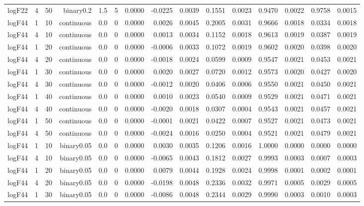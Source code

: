 \begin{longtable}{rrrrrrrrrrrrrrr}
  logF22 & 4 & 50 & binary0.2 & 1.5 & 5 & 0.0000 & -0.0225 & 0.0039 & 0.1551 & 0.0023 & 0.9470 & 0.0022 & 0.9758 & 0.0015 \\ 
  logF44 & 1 & 10 & continuous & 0.0 & 0 & 0.0000 & 0.0026 & 0.0045 & 0.2005 & 0.0031 & 0.9666 & 0.0018 & 0.0334 & 0.0018 \\ 
  logF44 & 4 & 10 & continuous & 0.0 & 0 & 0.0000 & 0.0013 & 0.0034 & 0.1152 & 0.0018 & 0.9613 & 0.0019 & 0.0387 & 0.0019 \\ 
  logF44 & 1 & 20 & continuous & 0.0 & 0 & 0.0000 & -0.0006 & 0.0033 & 0.1072 & 0.0019 & 0.9602 & 0.0020 & 0.0398 & 0.0020 \\ 
  logF44 & 4 & 20 & continuous & 0.0 & 0 & 0.0000 & -0.0018 & 0.0024 & 0.0599 & 0.0009 & 0.9547 & 0.0021 & 0.0453 & 0.0021 \\ 
  logF44 & 1 & 30 & continuous & 0.0 & 0 & 0.0000 & 0.0020 & 0.0027 & 0.0720 & 0.0012 & 0.9573 & 0.0020 & 0.0427 & 0.0020 \\ 
  logF44 & 4 & 30 & continuous & 0.0 & 0 & 0.0000 & -0.0012 & 0.0020 & 0.0406 & 0.0006 & 0.9550 & 0.0021 & 0.0450 & 0.0021 \\ 
  logF44 & 1 & 40 & continuous & 0.0 & 0 & 0.0000 & 0.0010 & 0.0023 & 0.0540 & 0.0009 & 0.9529 & 0.0021 & 0.0471 & 0.0021 \\ 
  logF44 & 4 & 40 & continuous & 0.0 & 0 & 0.0000 & -0.0020 & 0.0018 & 0.0307 & 0.0004 & 0.9543 & 0.0021 & 0.0457 & 0.0021 \\ 
  logF44 & 1 & 50 & continuous & 0.0 & 0 & 0.0000 & -0.0001 & 0.0021 & 0.0422 & 0.0007 & 0.9527 & 0.0021 & 0.0473 & 0.0021 \\ 
  logF44 & 4 & 50 & continuous & 0.0 & 0 & 0.0000 & -0.0024 & 0.0016 & 0.0250 & 0.0004 & 0.9521 & 0.0021 & 0.0479 & 0.0021 \\ 
  logF44 & 1 & 10 & binary0.05 & 0.0 & 0 & 0.0000 & 0.0030 & 0.0035 & 0.1206 & 0.0016 & 1.0000 & 0.0000 & 0.0000 & 0.0000 \\ 
  logF44 & 4 & 10 & binary0.05 & 0.0 & 0 & 0.0000 & -0.0065 & 0.0043 & 0.1812 & 0.0027 & 0.9993 & 0.0003 & 0.0007 & 0.0003 \\ 
  logF44 & 1 & 20 & binary0.05 & 0.0 & 0 & 0.0000 & 0.0079 & 0.0044 & 0.1928 & 0.0024 & 0.9998 & 0.0001 & 0.0002 & 0.0001 \\ 
  logF44 & 4 & 20 & binary0.05 & 0.0 & 0 & 0.0000 & -0.0198 & 0.0048 & 0.2336 & 0.0032 & 0.9971 & 0.0005 & 0.0029 & 0.0005 \\ 
  logF44 & 1 & 30 & binary0.05 & 0.0 & 0 & 0.0000 & -0.0086 & 0.0048 & 0.2344 & 0.0029 & 0.9990 & 0.0003 & 0.0010 & 0.0003 \\ 

\end{longtable}
